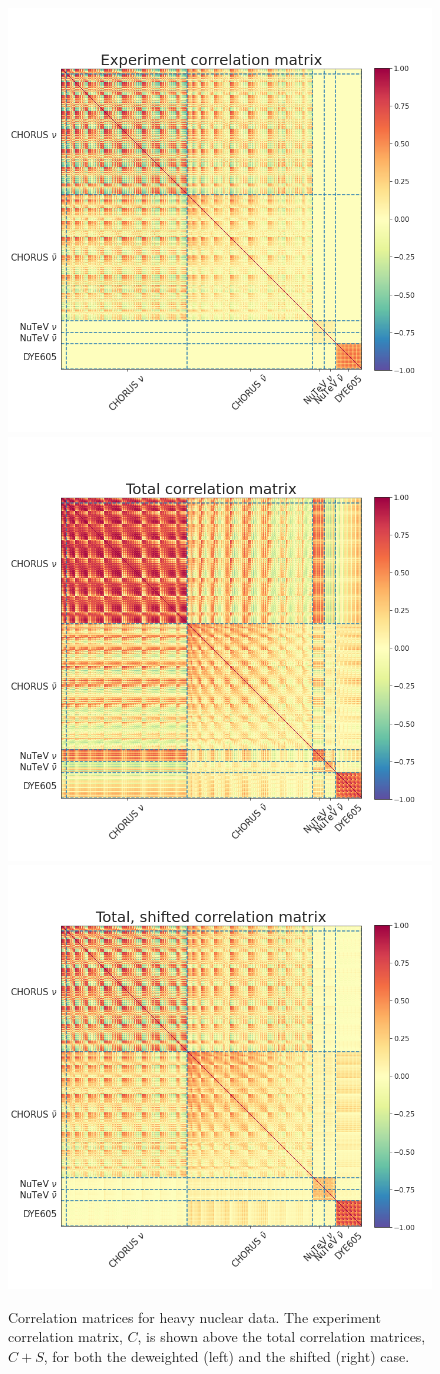 \begin{figure}[h]
  \begin{centering} 
  \hspace{2cm}
    \includegraphics[width=0.45\linewidth, trim=0 1cm 0 1cm]{nuclear/plots/covmats_Experiment_nuclear.png}
    \newline
    \includegraphics[width=0.45\linewidth]{nuclear/plots/covmats_Total_nuclear.png}
    \includegraphics[width=0.45\linewidth]{nuclear/plots/covmats_Total_shifted_nuclear.png}
   \caption{ Correlation matrices for heavy nuclear data. The experiment correlation matrix, $C$, is shown above the total correlation matrices, $C+S$, for both the deweighted (left) and the shifted (right) case.
    \label{fig:nuccov} }
  \end{centering}
\end{figure}

